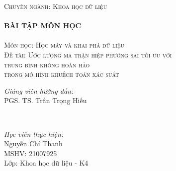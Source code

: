 \documentclass[14pt, a4paper]{article}
\numberwithin{equation}{section}
\numberwithin{figure}{section}
\numberwithin{dl}{section}
\numberwithin{md}{section}
\numberwithin{bd}{section}
\numberwithin{dn}{section}
\numberwithin{hq}{section}
\begin{document}
\begin{titlepage}
        \textsc{\Large Chuyên ngành: Khoa học dữ liệu}\\[0.5cm] %



        \HRule \\[0.4cm]
        { \huge \bfseries BÀI TẬP MÔN HỌC}\\[0.4cm] %
        \HRule \\[1.5cm]

        \textsc{\Large Môn học: Học máy và khai phá dữ liệu}\\[1cm] %


        \textsc{\Large Đề tài: Ước lượng ma trận hiệp phương sai tối ưu với \\ trung bình không hoàn hảo \\ trong mô hình khuếch toán xác suất}\\[2cm]


        \begin{minipage}{0.4\textwidth}
            \begin{flushleft} \large
            \emph{Giảng viên hướng dẫn:} \\
            PGS. TS. Trần Trọng Hiếu %
            \end{flushleft}
        \end{minipage}\\[0.5cm]

        \begin{minipage}{0.4\textwidth}
        \begin{flushleft} \large
        \emph{Học viên thực hiện:}\\
        Nguyễn Chí Thanh \\
        MSHV: 21007925 \\ %
        Lớp: Khoa học dữ liệu - K4
        \end{flushleft}
        \end{minipage}




\end{titlepage}
\end{document}
